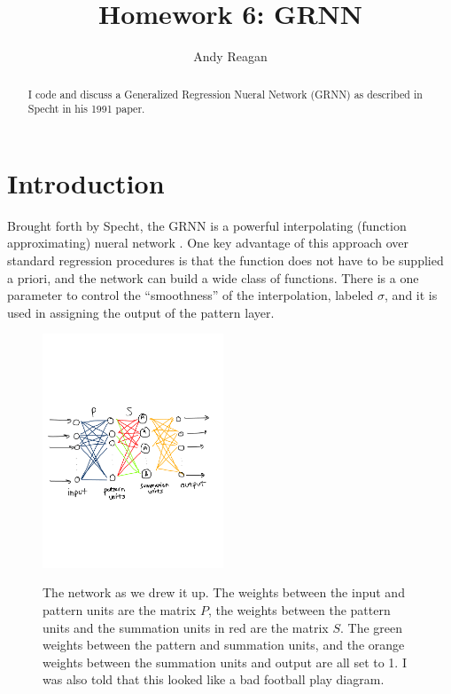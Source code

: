 \documentclass[pre,twocolumn,twoside,byrevtex,superscriptaddress]{revtex4}
\begin{document}




\title{\vspace{-2cm}Homework 6: GRNN}
\author{Andy Reagan}

\begin{abstract}
I code and discuss a Generalized Regression Nueral Network (GRNN) as described in Specht in his 1991 paper.
\end{abstract}

\maketitle

\section{Introduction}

Brought forth by Specht, the GRNN is a powerful interpolating (function approximating) nueral network \cite{specht1991a}.
One key advantage of this approach over standard regression procedures is that the function does not have to be supplied a priori, and the network can build a wide class of functions.
There is a one parameter to control the ``smoothness'' of the interpolation, labeled $\sigma$, and it is used in assigning the output of the pattern layer.

\begin{figure}
 \centering
  \includegraphics[width=0.48\textwidth]{../figures/GRNN-2.pdf}
  \label{fig:GRNN}
  \caption{The network as we drew it up. The weights between the input and pattern units are the matrix $P$, the weights between the pattern units and the summation units in red are the matrix $S$. The green weights between the pattern and summation units, and the orange weights between the summation units and output are all set to 1. I was also told that this looked like a bad football play diagram.}
\end{figure}
\end{document}
